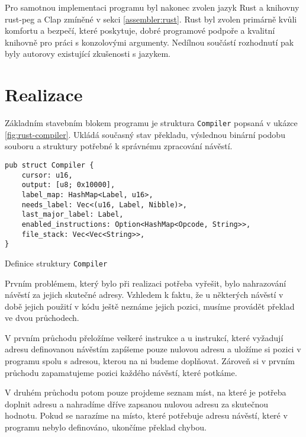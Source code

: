 Pro samotnou implementaci programu byl nakonec zvolen jazyk Rust a knihovny rust-peg a Clap zmíněné v sekci \ref{assembler:rust}. Rust byl zvolen primárně kvůli komfortu a bezpečí, které poskytuje, dobré programové podpoře a kvalitní knihovně pro práci s konzolovými argumenty. Nedílnou součástí rozhodnutí pak byly autorovy existující zkušenosti s jazykem.

\section{Realizace}

Základním stavebním blokem programu je struktura \texttt{Compiler} popsaná v ukázce \ref{fig:rust-compiler}. Ukládá současný stav překladu, výslednou binární podobu souboru a struktury potřebné k správnému zpracování návěstí.

\begin{listing}
\begin{verbatim}
pub struct Compiler {
    cursor: u16,
    output: [u8; 0x10000],
    label_map: HashMap<Label, u16>,
    needs_label: Vec<(u16, Label, Nibble)>,
    last_major_label: Label,
    enabled_instructions: Option<HashMap<Opcode, String>>,
    file_stack: Vec<Vec<String>>,
}
\end{verbatim}
\caption{Definice struktury \texttt{Compiler}}
\label{fig:rust-result}
\end{listing}

Prvním problémem, který bylo při realizaci potřeba vyřešit, bylo nahrazování návěstí za jejich skutečné adresy. Vzhledem k faktu, že u některých návěstí v době jejich použití v kódu ještě neznáme jejich pozici, musíme provádět překlad ve dvou průchodech.

V prvním průchodu přeložíme veškeré instrukce a u instrukcí, které vyžadují adresu definovanou návěstím zapíšeme pouze nulovou adresu a uložíme si pozici v programu spolu s adresou, kterou na ni budeme doplňovat. Zároveň si v prvním průchodu zapamatujeme pozici každého návěstí, které potkáme.

V druhém průchodu potom pouze projdeme seznam míst, na které je potřeba doplnit adresu a nahradíme dříve zapsanou nulovou adresu za skutečnou hodnotu. Pokud se narazíme na místo, které potřebuje adresu návěstí, které v programu nebylo definováno, ukončíme překlad chybou.

